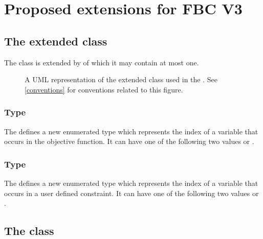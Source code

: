 
\newpage
\section{Proposed extensions for FBC V3}
\subsection{The extended  class}
\label{model-class-kv}

The \SBML \Model class is extended by  of which it may contain at most one.

\begin{figure}[ht]
  \centering
  \caption{A UML representation of the extended \SBML \Model class used in
  the \FBCPackage. See \ref{conventions} for conventions related to this
  figure.}
  \label{fig:fbc_uml_model_new}
\end{figure}

\subsubsection{Type }
\label{primtype-fbcfluxobjectivevariabletype}

The \FBCPackage defines a new enumerated type  which
represents the index of a variable that occurs in the objective function. It can have one
of the following two values  or .

\subsubsection{Type }
\label{primtype-fbcuserconstraintvariabletype}

The \FBCPackage defines a new enumerated type  which
represents the index of a variable that occurs in a user defined constraint. It can have one
of the following two values  or .

\subsection{The \FBC {} class}
